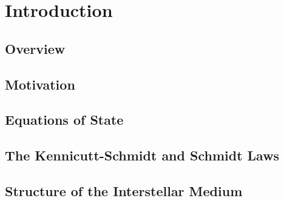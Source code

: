 \chapter{Introduction}\label{sec:introduction}

\section{Overview}


\section{Motivation}


\section{Equations of State}


\section{The Kennicutt-Schmidt and Schmidt Laws}


\section{Structure of the Interstellar Medium}

